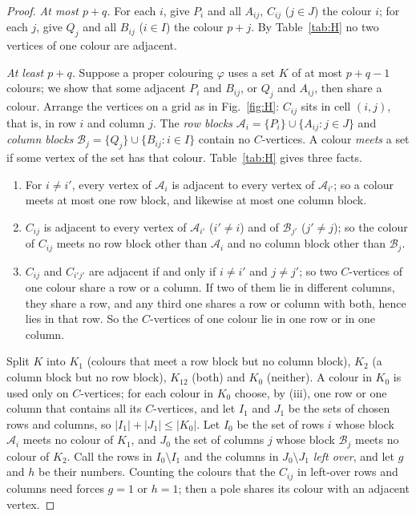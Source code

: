 \documentclass[10pt,a4paper,reqno]{amsart}
\newcommand{\RB}{\mathcal A}
\newcommand{\CB}{\mathcal B}
\begin{document}
\begin{proof}
\emph{At most $p+q$.} For each $i$, give $P_i$ and all $A_{ij}$, $C_{ij}$ ($j\in J$) the colour $i$; for each $j$, give $Q_j$ and all $B_{ij}$ ($i\in I$) the colour $p+j$. By Table~\ref{tab:H} no two vertices of one colour are adjacent.

\emph{At least $p+q$.} Suppose a proper colouring $\varphi$ uses a set $K$ of at most $p+q-1$ colours; we show that some adjacent $P_i$ and $B_{ij}$, or $Q_j$ and $A_{ij}$, then share a colour. Arrange the vertices on a grid as in Fig.~\ref{fig:H}: $C_{ij}$ sits in cell $(i,j)$, that is, in row $i$ and column $j$. The \emph{row blocks} $\RB_i=\{P_i\}\cup\{A_{ij}:j\in J\}$ and \emph{column blocks} $\CB_j=\{Q_j\}\cup\{B_{ij}:i\in I\}$ contain no $C$-vertices. A colour \emph{meets} a set if some vertex of the set has that colour. Table~\ref{tab:H} gives three facts.
\begin{enumerate}[label=(\roman*),leftmargin=*,nosep]
\item For $i\ne i'$, every vertex of $\RB_i$ is adjacent to every vertex of $\RB_{i'}$; so a colour meets at most one row block, and likewise at most one column block.
\item $C_{ij}$ is adjacent to every vertex of $\RB_{i'}$ ($i'\ne i$) and of $\CB_{j'}$ ($j'\ne j$); so the colour of $C_{ij}$ meets no row block other than $\RB_i$ and no column block other than $\CB_j$.
\item $C_{ij}$ and $C_{i'j'}$ are adjacent if and only if $i\ne i'$ and $j\ne j'$; so two $C$-vertices of one colour share a row or a column. If two of them lie in different columns, they share a row, and any third one shares a row or column with both, hence lies in that row. So the $C$-vertices of one colour lie in one row or in one column.
\end{enumerate}
Split $K$ into $K_1$ (colours that meet a row block but no column block), $K_2$ (a column block but no row block), $K_{12}$ (both) and $K_0$ (neither). A colour in $K_0$ is used only on $C$-vertices; for each colour in $K_0$ choose, by (iii), one row or one column that contains all its $C$-vertices, and let $I_1$ and $J_1$ be the sets of chosen rows and columns, so $|I_1|+|J_1|\le|K_0|$. Let $I_0$ be the set of rows $i$ whose block $\RB_i$ meets no colour of $K_1$, and $J_0$ the set of columns $j$ whose block $\CB_j$ meets no colour of $K_2$. Call the rows in $I_0\setminus I_1$ and the columns in $J_0\setminus J_1$ \emph{left over}, and let $g$ and $h$ be their numbers. Counting the colours that the $C_{ij}$ in left-over rows and columns need forces $g=1$ or $h=1$; then a pole shares its colour with an adjacent vertex.


\end{proof}
\end{document}
